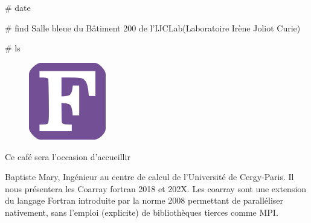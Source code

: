 \documentclass[final]{beamer}
\newlength{\twocolwid}
\begin{document}
\begin{frame}[t]
\begin{columns}[t]
\begin{column}{\twocolwid}
\begin{block}{\# date}
\end{block}


\begin{block}{\# find}
     Salle bleue du B\^{a}timent 200 de l'IJCLab\newline(Laboratoire Ir\`{e}ne Joliot Curie)
\end{block}

\begin{block}{\# ls}

\begin{figure}
\centering
\includegraphics[width=0.3\textwidth]{Fortran.png}
\end{figure}

     Ce caf\'{e} sera l'occasion d'accueillir 

Baptiste Mary, Ing\'{e}nieur au centre de calcul de l'Universit\'{e} de Cergy-Paris.
Il nous pr\'{e}sentera les Coarray fortran 2018 et 202X.
Les coarray sont une extension du langage Fortran introduite par la norme 2008 permettant
de parall\'{e}liser nativement, sans l'emploi (explicite) de bibliothèques tierces comme MPI.

\vspace{-0.8in}

\end{block}













\end{column}
\end{columns}
\end{frame}
\end{document}
